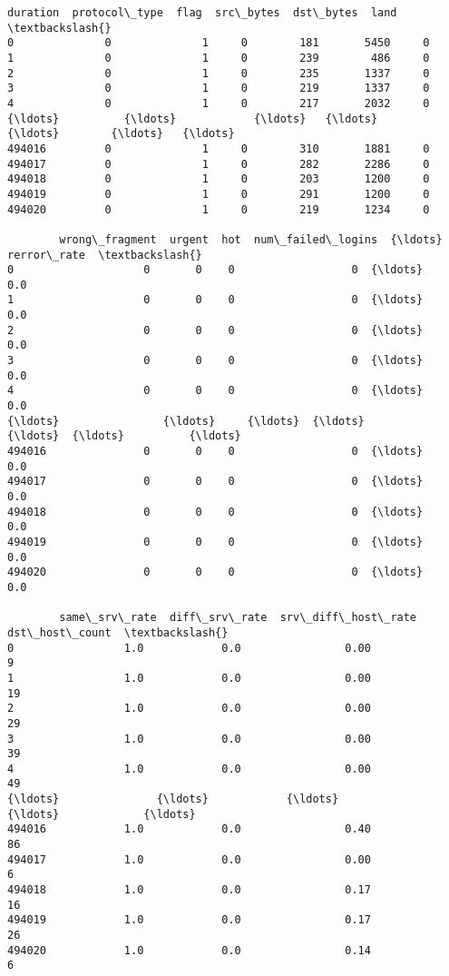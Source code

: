\documentclass[11pt]{article}
\makeatletter
\newcommand{\boxspacing}{\kern\kvtcb@left@rule\kern\kvtcb@boxsep}
\newcommand{\prompt}[4]{
        {\ttfamily\llap{{\color{#2}[#3]:\hspace{3pt}#4}}\vspace{-\baselineskip}}
    }
\makeatother
\begin{document}
            \begin{tcolorbox}[breakable, size=fbox, boxrule=.5pt, pad at break*=1mm, opacityfill=0]
\prompt{Out}{outcolor}{ }{\boxspacing}
\begin{Verbatim}[commandchars=\\\{\}]
        duration  protocol\_type  flag  src\_bytes  dst\_bytes  land  \textbackslash{}
0              0              1     0        181       5450     0
1              0              1     0        239        486     0
2              0              1     0        235       1337     0
3              0              1     0        219       1337     0
4              0              1     0        217       2032     0
{\ldots}          {\ldots}            {\ldots}   {\ldots}        {\ldots}        {\ldots}   {\ldots}
494016         0              1     0        310       1881     0
494017         0              1     0        282       2286     0
494018         0              1     0        203       1200     0
494019         0              1     0        291       1200     0
494020         0              1     0        219       1234     0

        wrong\_fragment  urgent  hot  num\_failed\_logins  {\ldots}  rerror\_rate  \textbackslash{}
0                    0       0    0                  0  {\ldots}          0.0
1                    0       0    0                  0  {\ldots}          0.0
2                    0       0    0                  0  {\ldots}          0.0
3                    0       0    0                  0  {\ldots}          0.0
4                    0       0    0                  0  {\ldots}          0.0
{\ldots}                {\ldots}     {\ldots}  {\ldots}                {\ldots}  {\ldots}          {\ldots}
494016               0       0    0                  0  {\ldots}          0.0
494017               0       0    0                  0  {\ldots}          0.0
494018               0       0    0                  0  {\ldots}          0.0
494019               0       0    0                  0  {\ldots}          0.0
494020               0       0    0                  0  {\ldots}          0.0

        same\_srv\_rate  diff\_srv\_rate  srv\_diff\_host\_rate  dst\_host\_count  \textbackslash{}
0                 1.0            0.0                0.00               9
1                 1.0            0.0                0.00              19
2                 1.0            0.0                0.00              29
3                 1.0            0.0                0.00              39
4                 1.0            0.0                0.00              49
{\ldots}               {\ldots}            {\ldots}                 {\ldots}             {\ldots}
494016            1.0            0.0                0.40              86
494017            1.0            0.0                0.00               6
494018            1.0            0.0                0.17              16
494019            1.0            0.0                0.17              26
494020            1.0            0.0                0.14               6


\end{Verbatim}
\end{tcolorbox}
\end{document}
